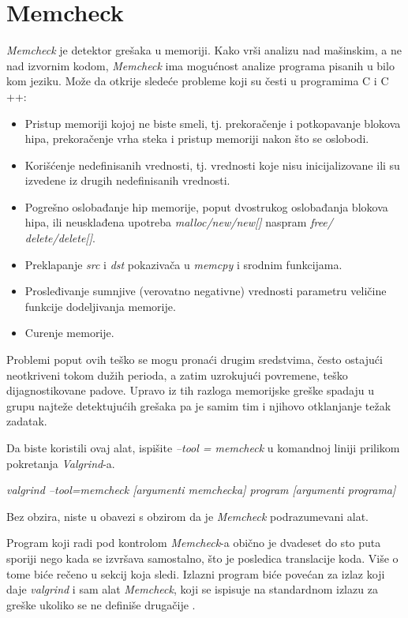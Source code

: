 \documentclass[12pt,oneside]{memoir}
\theoremstyle{plain}
\theoremstyle{definition}
\begin{document}
\section{Memcheck}
\textit{Memcheck} je detektor grešaka u memoriji. Kako vrši analizu nad mašinskim, a ne nad izvornim kodom, \textit{Memcheck} ima mogućnost analize programa pisanih u bilo kom jeziku. Može da otkrije sledeće probleme koji su česti u programima C i C ++:
\begin{itemize}
\item Pristup memoriji kojoj ne biste smeli, tj. prekoračenje i potkopavanje blokova hipa, prekoračenje vrha steka i pristup memoriji nakon što se oslobodi.
\item Korišćenje nedefinisanih vrednosti, tj. vrednosti koje nisu inicijalizovane ili su izvedene iz drugih nedefinisanih vrednosti.
\item Pogrešno oslobađanje hip memorije, poput dvostrukog oslobađanja blokova hipa, ili neusklađena upotreba \textit{malloc/new/new[]} naspram \textit{free/ delete/delete[]}.
\item Preklapanje \textit{src} i \textit{dst} pokazivača u \textit{memcpy} i srodnim funkcijama.
\item Prosleđivanje sumnjive (verovatno negativne) vrednosti parametru veličine funkcije dodeljivanja memorije.
\item Curenje memorije.
\end{itemize}

Problemi poput ovih teško se mogu pronaći drugim sredstvima, često ostajući neotkriveni tokom dužih perioda, a zatim uzrokujući povremene, teško dijagnostikovane padove. Upravo iz tih razloga memorijske greške spadaju u grupu najteže detektujućih grešaka pa je samim tim i njihovo otklanjanje težak zadatak.

Da biste koristili ovaj alat, ispišite \textit{--tool = memcheck} u komandnoj liniji prilikom pokretanja \textit{Valgrind}-a.
 \begin{center}
\textit{valgrind –tool=memcheck [argumenti memchecka] program [argumenti programa]}
\end{center}
Bez obzira, niste u obavezi s obzirom da je \textit{Memcheck} podrazumevani alat.

Program koji radi pod kontrolom \textit{Memcheck}-a obično je dvadeset do sto puta sporiji nego kada se izvršava samostalno, što je posledica translacije koda. Više o tome biće rečeno u sekcij koja sledi. Izlazni program biće povećan za izlaz koji daje \textit{valgrind} i sam alat \textit{Memcheck}, koji se ispisuje na standardnom izlazu za greške ukoliko se ne definiše drugačije \cite{Memcheck}. 
\end{document}
